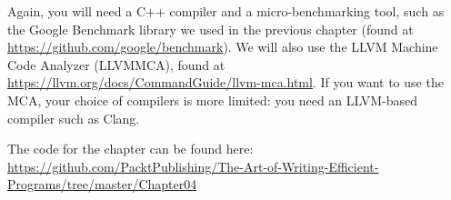 Again, you will need a C++ compiler and a micro-benchmarking tool, such as the Google Benchmark library we used in the previous chapter (found at \url{https://github.com/google/benchmark}). We will also use the LLVM Machine Code Analyzer (LLVMMCA), found at \url{https://llvm.org/docs/CommandGuide/llvm-mca.html}. If you want to use the MCA, your choice of compilers is more limited: you need an LLVM-based compiler such as Clang.

The code for the chapter can be found here: \url{https://github.com/PacktPublishing/The-Art-of-Writing-Efficient-Programs/tree/master/Chapter04}